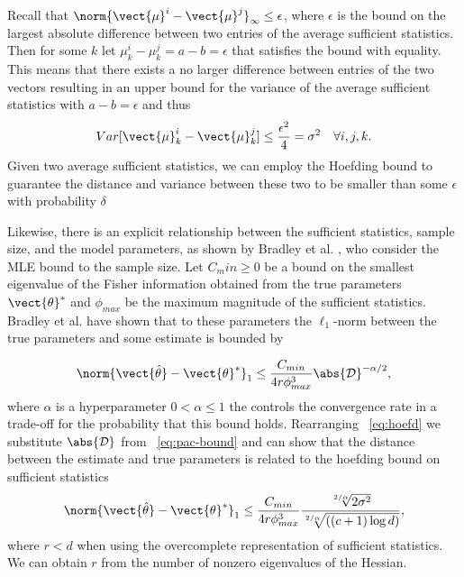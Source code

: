 

Recall that $\norm{\vect{\mu}^{i} -  \vect{\mu}^{j}}_\infty \leq  \epsilon$, where $\epsilon$ is the bound on the largest absolute difference between two entries of the average sufficient statistics. 
Then for some $k$ let  $\mu^{i}_k - \mu^{j}_k = a - b  = \epsilon$ that satisfies the bound with equality.
This means that there exists a no larger difference between entries of the two vectors resulting in an upper bound for the variance of the average sufficient statistics with $a - b = \epsilon$ and thus
\begin{equation*}
    Var[\vect{\mu}^{i}_k -  \vect{\mu}^{j}_k] \leq \frac{\epsilon^2}{4} = \sigma^2 \quad \forall i,j,k.
\end{equation*}
Given two average sufficient statistics, we can employ the Hoefding bound to guarantee the distance and variance between these two to be smaller than some $\epsilon$ with probability $\delta$

Likewise, there is an explicit relationship between the sufficient statistics, sample size, and the model parameters, as shown by Bradley et al. \cite{bradley2012sample}, who consider the MLE bound \wrt to the sample size. 
Let $C_min \geq 0$ be a bound on the smallest eigenvalue of the Fisher information obtained from the true parameters $\vect{\theta}^*$ and $\phi_{max}$ be the maximum magnitude of the sufficient statistics. 
Bradley et al. have shown that \wrt to these parameters the $\ell_1$-norm between the true parameters and some estimate is bounded by 

\begin{equation}
    \label{eq:pac-bound}
    \norm{\vect{\hat{\theta}}- \vect{\theta}^*}_1 \leq \frac{C_{min}}{4r\phi^3_{max}} \abs{\mathcal{D}}^{-\alpha/2},
\end{equation}
where $\alpha$ is a hyperparameter $0 < \alpha \leq 1$ the controls the convergence rate in a trade-off for the probability that this bound holds. 
Rearranging \eq~\ref{eq:hoefd} we substitute $\abs{\mathcal{D}}$ from \eq~\ref{eq:pac-bound} and can show that the distance between the estimate and true parameters is related to the hoefding bound on sufficient statistics
\begin{equation}
    \norm{\vect{\hat{\theta}}- \vect{\theta}^*}_1 \leq \frac{C_{min}}{4r\phi^3_{max}} \frac{\sqrt[2/\alpha]{2\sigma^2}}{\sqrt[2/\alpha]{((c+1) \log d)}},
\end{equation}
where $r < d$ when using the overcomplete representation of sufficient statistics.
We can obtain $r$ from the number of nonzero eigenvalues of the Hessian.


